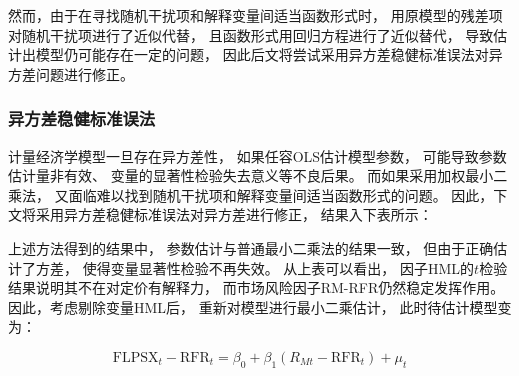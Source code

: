 \documentclass[UTF8]{ctexart}
\begin{document}
然而，由于在寻找随机干扰项和解释变量间适当函数形式时，
用原模型的残差项对随机干扰项进行了近似代替，
且函数形式用回归方程进行了近似替代，
导致估计出模型仍可能存在一定的问题，
因此后文将尝试采用异方差稳健标准误法对异方差问题进行修正。

\subsubsection{异方差稳健标准误法}

计量经济学模型一旦存在异方差性，
如果任容OLS估计模型参数，
可能导致参数估计量非有效、
变量的显著性检验失去意义等不良后果。
而如果采用加权最小二乘法，
又面临难以找到随机干扰项和解释变量间适当函数形式的问题。
因此，下文将采用异方差稳健标准误法对异方差进行修正，
结果入下表所示：


上述方法得到的结果中，
参数估计与普通最小二乘法的结果一致，
但由于正确估计了方差，
使得变量显著性检验不再失效。
从上表可以看出，
因子HML的$t$检验结果说明其不在对定价有解释力，
而市场风险因子RM-RFR仍然稳定发挥作用。
因此，考虑剔除变量HML后，
重新对模型进行最小二乘估计，
此时待估计模型变为：

\begin{equation}
  \text{FLPSX}_t-\mathrm{RFR}_t=\beta_0+\beta_1\left( R_{Mt}-\mathrm{RFR}_t \right)+ \mu_t
\end{equation}

\end{document}
